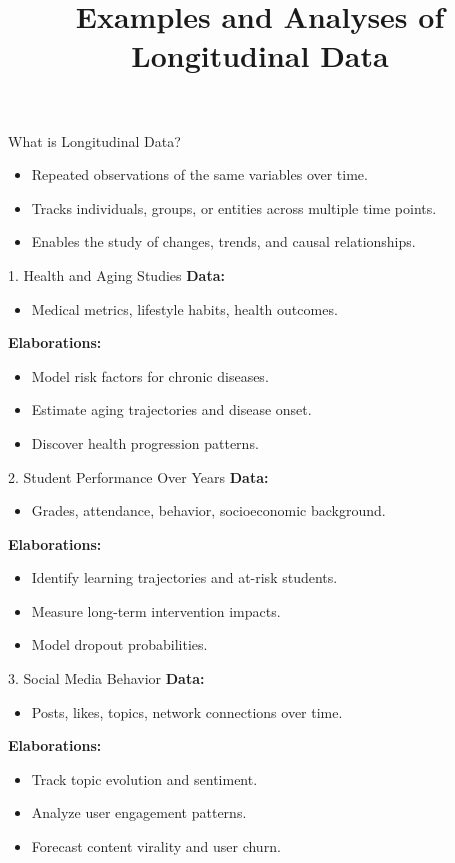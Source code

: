 \documentclass{beamer}
\title{Examples and Analyses of Longitudinal Data}
\author{}
\date{}
\begin{document}
\frame{\titlepage}

\begin{frame}{What is Longitudinal Data?}
\begin{itemize}
    \item Repeated observations of the same variables over time.
    \item Tracks individuals, groups, or entities across multiple time points.
    \item Enables the study of changes, trends, and causal relationships.
\end{itemize}
\end{frame}

\begin{frame}{1. Health and Aging Studies}
\textbf{Data:}
\begin{itemize}
    \item Medical metrics, lifestyle habits, health outcomes.
\end{itemize}
\textbf{Elaborations:}
\begin{itemize}
    \item Model risk factors for chronic diseases.
    \item Estimate aging trajectories and disease onset.
    \item Discover health progression patterns.
\end{itemize}
\end{frame}

\begin{frame}{2. Student Performance Over Years}
\textbf{Data:}
\begin{itemize}
    \item Grades, attendance, behavior, socioeconomic background.
\end{itemize}
\textbf{Elaborations:}
\begin{itemize}
    \item Identify learning trajectories and at-risk students.
    \item Measure long-term intervention impacts.
    \item Model dropout probabilities.
\end{itemize}
\end{frame}

\begin{frame}{3. Social Media Behavior}
\textbf{Data:}
\begin{itemize}
    \item Posts, likes, topics, network connections over time.
\end{itemize}
\textbf{Elaborations:}
\begin{itemize}
    \item Track topic evolution and sentiment.
    \item Analyze user engagement patterns.
    \item Forecast content virality and user churn.
\end{itemize}
\end{frame}
\end{document}
